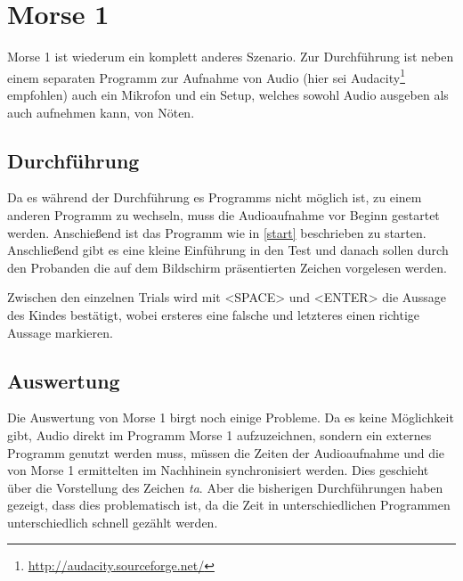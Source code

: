 \documentclass[a4paper]{scrartcl}
\newtheorem[M]{thmL}{Definition}
\begin{document}
\section{Morse 1}
Morse 1 ist wiederum ein komplett anderes Szenario. Zur Durchführung ist neben einem separaten Programm zur Aufnahme von Audio (hier sei Audacity\footnote{\url{http://audacity.sourceforge.net/}} empfohlen) auch ein Mikrofon und ein Setup, welches sowohl Audio ausgeben als auch aufnehmen kann, von Nöten.

\subsection{Durchführung}
Da es während der Durchführung es Programms nicht möglich ist, zu einem anderen Programm zu wechseln, muss die Audioaufnahme vor Beginn gestartet werden. Anschießend ist das Programm wie in \autoref{start} beschrieben zu starten. Anschließend gibt es eine kleine Einführung in den Test und danach sollen durch den Probanden die auf dem Bildschirm präsentierten Zeichen vorgelesen werden.

Zwischen den einzelnen Trials wird mit <SPACE> und <ENTER> die Aussage des Kindes bestätigt, wobei ersteres eine falsche und letzteres einen richtige Aussage markieren.

\subsection{Auswertung}
Die Auswertung von Morse 1 birgt noch einige Probleme. Da es keine Möglichkeit gibt, Audio direkt im Programm Morse 1 aufzuzeichnen, sondern ein externes Programm genutzt werden muss, müssen die Zeiten der Audioaufnahme und die von Morse 1 ermittelten im Nachhinein synchronisiert werden. Dies geschieht über die Vorstellung des Zeichen \emph{ta}. Aber die bisherigen Durchführungen haben gezeigt, dass dies problematisch ist, da die Zeit in unterschiedlichen Programmen unterschiedlich schnell gezählt werden.
\end{document}
